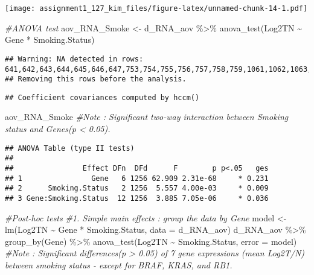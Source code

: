 \documentclass[
]{article}
\newenvironment{Shaded}{\begin{snugshade}}{\end{snugshade}}
\newcommand{\AttributeTok}[1]{\textcolor[rgb]{0.77,0.63,0.00}{#1}}
\newcommand{\CommentTok}[1]{\textcolor[rgb]{0.56,0.35,0.01}{\textit{#1}}}
\newcommand{\FunctionTok}[1]{\textcolor[rgb]{0.00,0.00,0.00}{#1}}
\newcommand{\NormalTok}[1]{#1}
\newcommand{\OtherTok}[1]{\textcolor[rgb]{0.56,0.35,0.01}{#1}}
\newcommand{\SpecialCharTok}[1]{\textcolor[rgb]{0.00,0.00,0.00}{#1}}
\begin{document}
\texttt{[image: assignment1\_127\_kim\_files/figure-latex/unnamed-chunk-14-1.pdf]}

\begin{Shaded}
\begin{Highlighting}[]
\CommentTok{\#ANOVA test}
\NormalTok{aov\_RNA\_Smoke }\OtherTok{\textless{}{-}}\NormalTok{ d\_RNA\_aov }\SpecialCharTok{\%\textgreater{}\%} \FunctionTok{anova\_test}\NormalTok{(Log2TN }\SpecialCharTok{\textasciitilde{}}\NormalTok{ Gene }\SpecialCharTok{*}\NormalTok{ Smoking.Status)}
\end{Highlighting}
\end{Shaded}

\begin{verbatim}
## Warning: NA detected in rows: 641,642,643,644,645,646,647,753,754,755,756,757,758,759,1061,1062,1063,1064,1065,1066,1067,1138,1139,1140,1141,1142,1143,1144,1264,1265,1266,1267,1268,1269,1270,1278,1279,1280,1281,1282,1283,1284,1313,1314,1315,1316,1317,1318,1319.
## Removing this rows before the analysis.
\end{verbatim}

\begin{verbatim}
## Coefficient covariances computed by hccm()
\end{verbatim}

\begin{Shaded}
\begin{Highlighting}[]
\NormalTok{aov\_RNA\_Smoke }\CommentTok{\#Note : Significant two{-}way interaction between Smoking status and Genes(p \textless{} 0.05).}
\end{Highlighting}
\end{Shaded}

\begin{verbatim}
## ANOVA Table (type II tests)
## 
##                Effect DFn  DFd      F        p p<.05   ges
## 1                Gene   6 1256 62.909 2.31e-68     * 0.231
## 2      Smoking.Status   2 1256  5.557 4.00e-03     * 0.009
## 3 Gene:Smoking.Status  12 1256  3.885 7.05e-06     * 0.036
\end{verbatim}

\begin{Shaded}
\begin{Highlighting}[]
\CommentTok{\#Post{-}hoc tests}
\CommentTok{\#1. Simple main effects : group the data by Gene}
\NormalTok{model }\OtherTok{\textless{}{-}} \FunctionTok{lm}\NormalTok{(Log2TN }\SpecialCharTok{\textasciitilde{}}\NormalTok{ Gene }\SpecialCharTok{*}\NormalTok{ Smoking.Status, }\AttributeTok{data =}\NormalTok{ d\_RNA\_aov)}
\NormalTok{d\_RNA\_aov }\SpecialCharTok{\%\textgreater{}\%}
  \FunctionTok{group\_by}\NormalTok{(Gene) }\SpecialCharTok{\%\textgreater{}\%}
  \FunctionTok{anova\_test}\NormalTok{(Log2TN }\SpecialCharTok{\textasciitilde{}}\NormalTok{ Smoking.Status, }\AttributeTok{error =}\NormalTok{ model) }\CommentTok{\#Note : Significant differences(p \textgreater{} 0.05) of 7 gene expressions (mean Log2T/N) between smoking status {-} except for BRAF, KRAS, and RB1.}
\end{Highlighting}
\end{Shaded}
\end{document}
